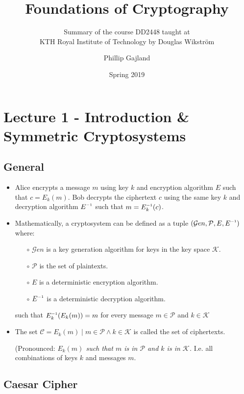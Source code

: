 \documentclass[a4paper]{scrartcl}
\title{Foundations of Cryptography}
\subtitle{Summary of the course DD2448 taught at\\KTH Royal Institute of Technology by Douglas Wikström}
\author{Phillip Gajland}
\date{Spring 2019}
\newcommand{\inv}{^{\raisebox{.2ex}{$\scriptscriptstyle-1$}}}
\begin{document}
\thispagestyle{empty}
\maketitle

\section*{Lecture 1 - Introduction \& Symmetric Cryptosystems}

\subsection*{General}

\begin{itemize}
\item Alice encrypts a message $m$ using key $k$ and encryption algorithm $E$ such that $c = E_k(m)$. Bob decrypts the ciphertext $c$ using the same key $k$ and decryption algorithm  $E\inv$ such that $m = E_k\inv(c)$.
\item Mathematically, a cryptosystem can be defined as a tuple $({\mathcal Gen},{\mathcal {P}}, E, E\inv)$ where:
\begin{itemize}
\item [$\circ$] ${\mathcal Gen}$ is a key generation algorithm for keys in the key space ${\mathcal {K}}$.
\item [$\circ$] ${\mathcal {P}}$ is the set of plaintexts.
\item [$\circ$] $E$ is a deterministic encryption algorithm.
\item [$\circ$] $E\inv$ is a deterministic decryption algorithm.
\end{itemize}
such that $E_k\inv(E_k(m)) = m$ for every message $m \in {\mathcal {P}}$ and $k \in {\mathcal {K}}$
\item The set ${\mathcal {C}} = E_k(m) \mid m \in {\mathcal {P}} \land k \in {\mathcal {K}}$ is called the set of ciphertexts.

(Pronounced: \textit{$E_k(m)$ such that $m$ is in ${\mathcal {P}}$ and $k$ is in ${\mathcal {K}}$.} I.e. all combinations of keys $k$ and messages $m$.
\end{itemize}

\subsection*{Caesar Cipher}
\end{document}
